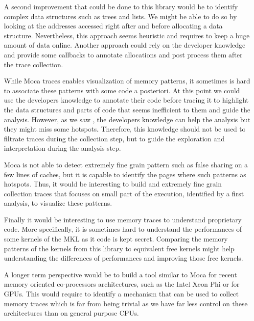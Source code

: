 A second improvement that could be done to this library would be to identify complex data structures such as trees and lists.
We might be able to do so by looking at the addresses accessed right after and before allocating a data structure.
Nevertheless, this approach seems heuristic and requires to keep a huge amount of data online.
Another approach could rely on the developer knowledge and provide some callbacks to annotate allocations and post process them after the trace collection.

While \gls{Moca} traces enables visualization of memory patterns, it sometimes is hard to associate these patterns with some code a posteriori.
At this point we could use the developers knowledge to annotate their code before tracing it to highlight the data structures and parts of code that seems inefficient to them and guide the analysis.
However, as we saw , the developers knowledge can help the analysis but they might miss some hotspots.
Therefore, this knowledge should not be used to filtrate traces during the collection step, but to guide the exploration and interpretation during the analysis step.

\gls{Moca} is not able to detect extremely fine grain pattern such as false sharing on a few lines of caches, but it is capable to identify the pages where such patterns as hotspots.
Thus, it would be interesting to build and extremely fine grain collection traces that focuses on small part of the execution, identified by a first analysis, to visualize these patterns.

Finally it would be interesting to use memory traces to understand proprietary code.
More specifically, it is sometimes hard to understand the performances of some kernels of the \gls{MKL} as it code is kept secret.
Comparing the memory patterns of the kernels from this library to equivalent free kernels might help understanding the differences of performances and improving those free kernels.

A longer term perspective would be to build a tool similar to \gls{Moca} for recent memory oriented co-processors architectures, such as the \gls{Intel} Xeon Phi or for \glspl{GPU}.
This would require to identify a mechanism that can be used to collect memory traces which is far from being trivial as we have far less control on these architectures than on general purpose \glspl{CPU}.
